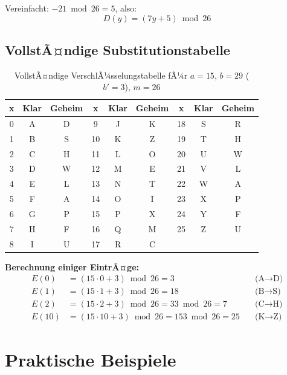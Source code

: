 ﻿\documentclass[12pt,a4paper]{article}
\begin{document}
	Vereinfacht: $-21 \bmod 26 = 5$, also:
	\begin{equation}
		\boxed{D(y) = (7y + 5) \bmod 26}
	\end{equation}
	
	\subsection{VollstÃ¤ndige Substitutionstabelle}
	
	\begin{table}[ht]
		\centering
		\caption{VollstÃ¤ndige VerschlÃ¼sselungstabelle fÃ¼r $a=15$, $b=29$ ($b'=3$), $m=26$}
		\begin{tabular}{|c|c|c||c|c|c||c|c|c|}
			\hline
			\textbf{x} & \textbf{Klar} & \textbf{Geheim} & \textbf{x} & \textbf{Klar} & \textbf{Geheim} & \textbf{x} & \textbf{Klar} & \textbf{Geheim} \\
			\hline
			0 & A & D & 9 & J & K & 18 & S & R \\
			1 & B & S & 10 & K & Z & 19 & T & H \\
			2 & C & H & 11 & L & O & 20 & U & W \\
			3 & D & W & 12 & M & E & 21 & V & L \\
			4 & E & L & 13 & N & T & 22 & W & A \\
			5 & F & A & 14 & O & I & 23 & X & P \\
			6 & G & P & 15 & P & X & 24 & Y & F \\
			7 & H & F & 16 & Q & M & 25 & Z & U \\
			8 & I & U & 17 & R & C & & & \\
			\hline
		\end{tabular}
	\end{table}
	
	\textbf{Berechnung einiger EintrÃ¤ge:}
	\begin{align}
		E(0) &= (15 \cdot 0 + 3) \bmod 26 = 3 \quad &\text{(A} \to \text{D)} \\
		E(1) &= (15 \cdot 1 + 3) \bmod 26 = 18 \quad &\text{(B} \to \text{S)} \\
		E(2) &= (15 \cdot 2 + 3) \bmod 26 = 33 \bmod 26 = 7 \quad &\text{(C} \to \text{H)} \\
		E(10) &= (15 \cdot 10 + 3) \bmod 26 = 153 \bmod 26 = 25 \quad &\text{(K} \to \text{Z)}
	\end{align}
	
	\section{Praktische Beispiele}
	
\end{document}
